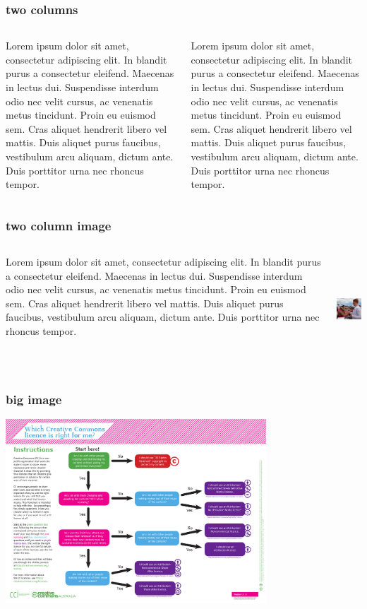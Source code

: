 \documentclass[hyperref={pdfpagelabels=false},spanish]{beamer}
\begin{document}
\begin{frame}
\frametitle{two columns} 
	\begin{columns}[t]
		\begin{column}{5cm}
			Lorem ipsum dolor sit amet, consectetur adipiscing elit. In blandit purus a consectetur eleifend. Maecenas in lectus dui. Suspendisse interdum odio nec velit cursus, ac venenatis metus tincidunt. Proin eu euismod sem. Cras aliquet hendrerit libero vel mattis. Duis aliquet purus faucibus, vestibulum arcu aliquam, dictum ante. Duis porttitor urna nec rhoncus tempor.
		\end{column}
		\begin{column}{5cm}
			Lorem ipsum dolor sit amet, consectetur adipiscing elit. In blandit purus a consectetur eleifend. Maecenas in lectus dui. Suspendisse interdum odio nec velit cursus, ac venenatis metus tincidunt. Proin eu euismod sem. Cras aliquet hendrerit libero vel mattis. Duis aliquet purus faucibus, vestibulum arcu aliquam, dictum ante. Duis porttitor urna nec rhoncus tempor.
		\end{column}
	\end{columns}
\end{frame}

\begin{frame}
\frametitle{two column image} 
	\begin{columns}[c]
		\begin{column}{5cm}
		Lorem ipsum dolor sit amet, consectetur adipiscing elit. In blandit purus a consectetur eleifend. Maecenas in lectus dui. Suspendisse interdum odio nec velit cursus, ac venenatis metus tincidunt. Proin eu euismod sem. Cras aliquet hendrerit libero vel mattis. Duis aliquet purus faucibus, vestibulum arcu aliquam, dictum ante. Duis porttitor urna nec rhoncus tempor.
		\end{column}
		\begin{column}{5cm}
			\includegraphics[height=4cm]{imgs/barba-con-cervezas.jpg}
		\end{column}
	\end{columns}
\end{frame}

\begin{frame}
\frametitle{big image}
	\begin{center} 
		\includegraphics[height=6.9cm]{imgs/licensing-flowchart.pdf}
	\end{center}
\end{frame}
\end{document}
